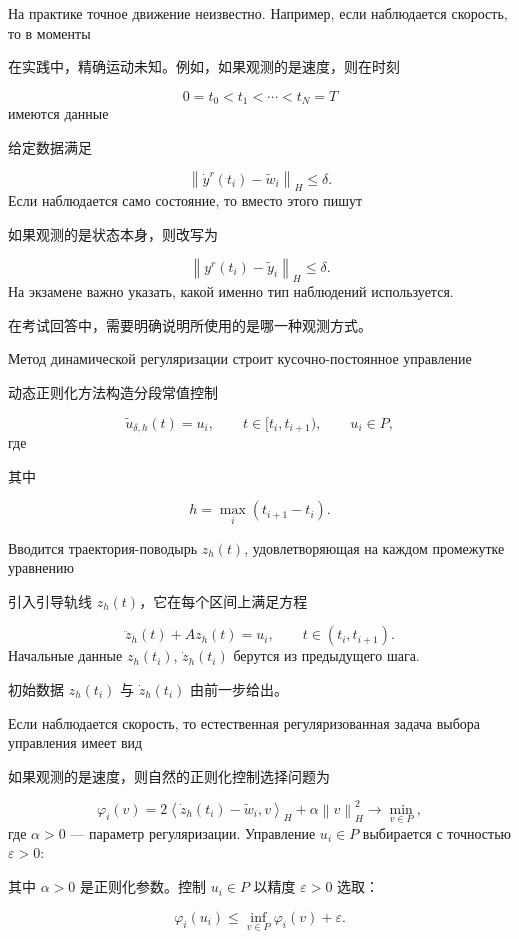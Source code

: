 \documentclass[12pt,a4paper]{article}
\newcommand{\norm}[1]{\left\lVert #1\right\rVert}
\newcommand{\inner}[2]{\left\langle #1,#2\right\rangle}
\newcommand{\zh}[1]{\par\noindent #1\par}
\begin{document}
На практике точное движение неизвестно. Например, если наблюдается скорость, то в моменты
\zh{在实践中，精确运动未知。例如，如果观测的是速度，则在时刻}
\[
    0=t_0<t_1<\cdots<t_N=T
\]
имеются данные
\zh{给定数据满足}
\begin{equation}
    \norm{\dot y^r(t_i)-\tilde w_i}_H\le \delta.
\end{equation}
Если наблюдается само состояние, то вместо этого пишут
\zh{如果观测的是状态本身，则改写为}
\begin{equation}
    \norm{y^r(t_i)-\tilde y_i}_H\le \delta.
\end{equation}
На экзамене важно указать, какой именно тип наблюдений используется.
\zh{在考试回答中，需要明确说明所使用的是哪一种观测方式。}


Метод динамической регуляризации строит кусочно-постоянное управление
\zh{动态正则化方法构造分段常值控制}
\begin{equation}
    \tilde u_{\delta,h}(t)=u_i,
    \qquad t\in[t_i,t_{i+1}),
    \qquad u_i\in P,
\end{equation}
где
\zh{其中}
\begin{equation}
    h=\max_i(t_{i+1}-t_i).
\end{equation}

Вводится траектория-поводырь $z_h(t)$, удовлетворяющая на каждом промежутке уравнению
\zh{引入引导轨线 $z_h(t)$，它在每个区间上满足方程}
\begin{equation}
    \ddot z_h(t)+Az_h(t)=u_i,
    \qquad t\in(t_i,t_{i+1}).
\end{equation}
Начальные данные $z_h(t_i)$, $\dot z_h(t_i)$ берутся из предыдущего шага.
\zh{初始数据 $z_h(t_i)$ 与 $\dot z_h(t_i)$ 由前一步给出。}

Если наблюдается скорость, то естественная регуляризованная задача выбора управления имеет вид
\zh{如果观测的是速度，则自然的正则化控制选择问题为}
\begin{equation}
    \varphi_i(v)
    =2\inner{\dot z_h(t_i)-\tilde w_i}{v}_H
    +\alpha\norm{v}_H^2
    \to \min_{v\in P},
\end{equation}
где $\alpha>0$ --- параметр регуляризации. Управление $u_i\in P$ выбирается с точностью $\varepsilon>0$:
\zh{其中 $\alpha>0$ 是正则化参数。控制 $u_i\in P$ 以精度 $\varepsilon>0$ 选取：}
\begin{equation}
    \varphi_i(u_i)\le \inf_{v\in P}\varphi_i(v)+\varepsilon.
\end{equation}
\end{document}
